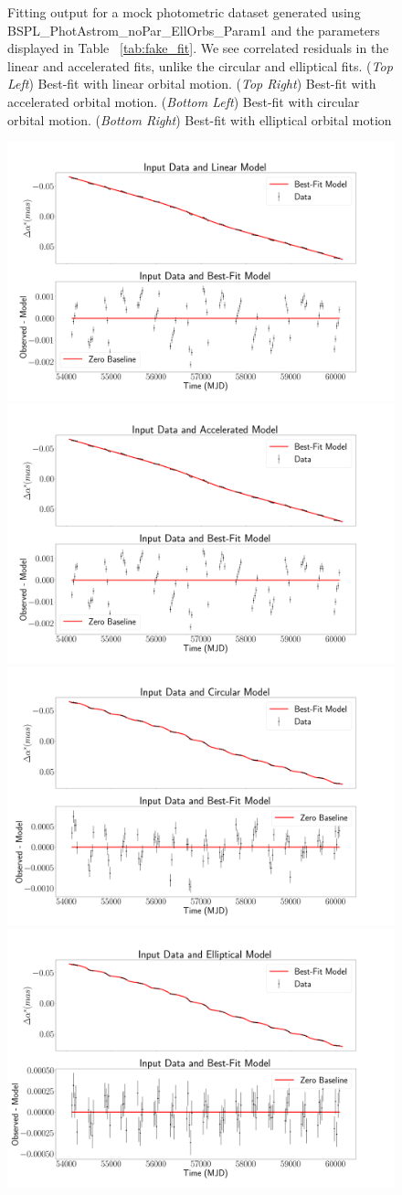 \documentclass[twocolumn]{aastex701}
\begin{document}
\begin{figure}
    \caption{Fitting output for a mock photometric dataset generated using  BSPL\_PhotAstrom\_noPar\_EllOrbs\_Param1 and the parameters displayed in Table ~\ref{tab:fake_fit}. We see correlated residuals in the linear and accelerated fits, unlike the circular and elliptical fits. 
    (\emph{Top Left}) Best-fit with linear orbital motion. (\emph{Top Right}) Best-fit with accelerated orbital motion. (\emph{Bottom Left}) Best-fit with circular orbital motion. (\emph{Bottom Right}) Best-fit with elliptical orbital motion}
    \label{fig:orbital_comparison}
\end{figure}



\begin{figure}
    \centering
    \includegraphics[width= .48 \textwidth]{figures/LinAnalAst1.png}
    \includegraphics[width= .48 \textwidth]{figures/AccAnalAst1.png}
    \includegraphics[width= .48\textwidth]{figures/CircAnalAst1.png}
    \includegraphics[width= .48\textwidth]{figures/EllAnalAst1.png}


\end{figure}
\end{document}
